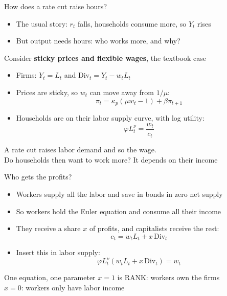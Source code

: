 \documentclass[10pt,english]{beamer}
\begin{document}
\begin{frame}{How does a rate cut raise hours?}
\begin{itemize}
\item The usual story: $r_{t}$ falls, households consume more, so $Y_{t}$ rises
\item But output needs hours: \alert{who works more, and why?}
\end{itemize}
\medskip{}
Consider \textbf{sticky prices and flexible wages}, the textbook case
\begin{itemize}
\item Firms: $Y_{t}=L_{t}$ and $\text{Div}_{t}=Y_{t}-w_{t}L_{t}$
\item Prices are sticky, so $w_{t}$ can move away from $1/\mu$:
\[
\pi_{t}=\kappa_{p}\left(\mu w_{t}-1\right)+\beta\pi_{t+1}
\]
\item Households are on their labor supply curve, with log utility:
\[
\varphi L_{t}^{\nu}=\frac{w_{t}}{c_{t}}
\]
\end{itemize}
A rate cut raises labor demand and so the wage.\\
Do households then want to work more? \alert{It depends on their income}
\end{frame}
%
\begin{frame}{Who gets the profits?}
\begin{itemize}
\item Workers supply all the labor and save in bonds in zero net supply
\item So workers hold the Euler equation and consume all their income
\item They receive a share $x$ of profits, and capitalists receive the rest:
\[
c_{t}=w_{t}L_{t}+x\,\text{Div}_{t}
\]
\item Insert this in labor supply:
\[
\varphi L_{t}^{\nu}\left(w_{t}L_{t}+x\,\text{Div}_{t}\right)=w_{t}
\]
\end{itemize}
\begin{alertblock}{One equation, one parameter}
$x=1$ is RANK: workers own the firms\\
$x=0$: workers only have labor income
\end{alertblock}
\end{frame}
%
\end{document}
